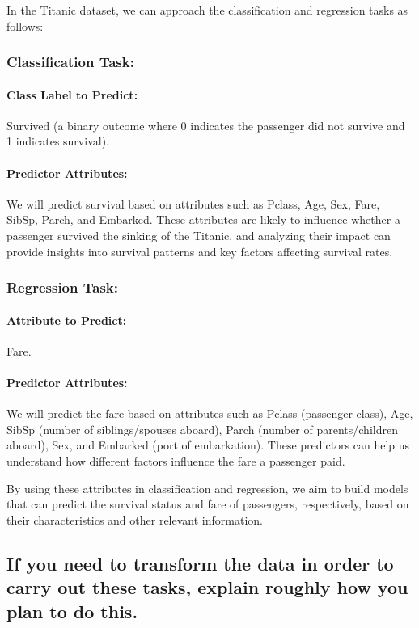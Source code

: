 \documentclass[twoside,11pt]{article}
\begin{document}
In the Titanic dataset, we can approach the classification and regression tasks as follows:

\subsubsection*{Classification Task:}

\paragraph{Class Label to Predict:} Survived (a binary outcome where 0 indicates the passenger did not survive and 1 indicates survival).

\paragraph{Predictor Attributes:} We will predict survival based on attributes such as Pclass, Age, Sex, Fare, SibSp, Parch, and Embarked. These attributes are likely to influence whether a passenger survived the sinking of the Titanic, and analyzing their impact can provide insights into survival patterns and key factors affecting survival rates.

\subsubsection*{Regression Task:}

\paragraph{Attribute to Predict:} Fare.

\paragraph{Predictor Attributes:} We will predict the fare based on attributes such as Pclass (passenger class), Age, SibSp (number of siblings/spouses aboard), Parch (number of parents/children aboard), Sex, and Embarked (port of embarkation). These predictors can help us understand how different factors influence the fare a passenger paid.

By using these attributes in classification and regression, we aim to build models that can predict the survival status and fare of passengers, respectively, based on their characteristics and other relevant information.

\subsection*{If you need to transform the data in order to carry out these tasks, explain roughly how you plan to do this.}
\end{document}
